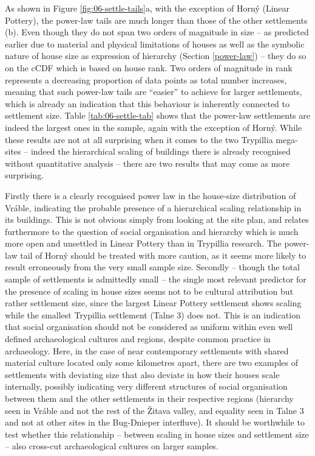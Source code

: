 \documentclass[
  12pt,
]{book}
\begin{document}
As shown in Figure \ref{fig:06-settle-tails}a, with the exception of Horný (Linear Pottery), the power-law tails are much longer than those of the other settlements (b). Even though they do not span two orders of magnitude in size -- as predicted earlier due to material and physical limitations of houses as well as the symbolic nature of house size as expression of hierarchy (Section \ref{power-law}) -- they do so on the cCDF which is based on house rank. Two orders of magnitude in rank represents a decreasing proportion of data points as total number increases, meaning that such power-law tails are ``easier'' to achieve for larger settlements, which is already an indication that this behaviour is inherently connected to settlement size. Table \ref{tab:06-settle-tab} shows that the power-law settlements are indeed the largest ones in the sample, again with the exception of Horný. While these results are not at all surprising when it comes to the two Trypillia mega-sites -- indeed the hierarchical scaling of buildings there is already recognised without quantitative analysis -- there are two results that may come as more surprising.

Firstly there is a clearly recognised power law in the house-size distribution of Vráble, indicating the probable presence of a hierarchical scaling relationship in its buildings. This is not obvious simply from looking at the site plan, and relates furthermore to the question of social organisation and hierarchy which is much more open and unsettled in Linear Pottery than in Trypillia research. The power-law tail of Horný should be treated with more caution, as it seems more likely to result erroneously from the very small sample size. Secondly -- though the total sample of settlements is admittedly small -- the single most relevant predictor for the presence of scaling in house sizes seems not to be cultural attribution but rather settlement size, since the largest Linear Pottery settlement shows scaling while the smallest Trypillia settlement (Talne 3) does not. This is an indication that social organisation should not be considered as uniform within even well defined archaeological cultures and regions, despite common practice in archaeology. Here, in the case of near contemporary settlements with shared material culture located only some kilometres apart, there are two examples of settlements with deviating size that also deviate in how their houses scale internally, possibly indicating very different structures of social organisation between them and the other settlements in their respective regions (hierarchy seen in Vráble and not the rest of the Žitava valley, and equality seen in Talne 3 and not at other sites in the Bug-Dnieper interfluve). It should be worthwhile to test whether this relationship -- between scaling in house sizes and settlement size -- also cross-cut archaeological cultures on larger samples.
\end{document}
